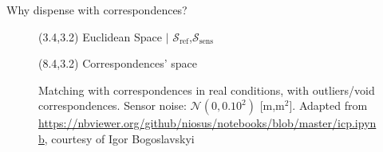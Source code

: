 \begin{frame}[noframenumbering]{Why dispense with correspondences?}


  \begin{figure}\vspace{1cm}
    \caption{Matching with correspondences in real conditions, with
             outliers/void correspondences. Sensor noise:
             $\mathcal{N}(0, 0.10^2)$ [m,m$^2$]. Adapted from
             \url{https://nbviewer.org/github/niosus/notebooks/blob/master/icp.ipynb},
              courtesy of Igor Bogoslavskyi}
    \begin{textblock}{5}(3.4,3.2)
      \scriptsize Euclidean Space $|$ \textcolor{r}{$\mathcal{S}_{\text{ref}}$},\textcolor{b}{$\mathcal{S}_{\text{sens}}$}
    \end{textblock}
    \begin{textblock}{4}(8.4,3.2)
      \scriptsize Correspondences' space
    \end{textblock}
  \end{figure}

\end{frame}
